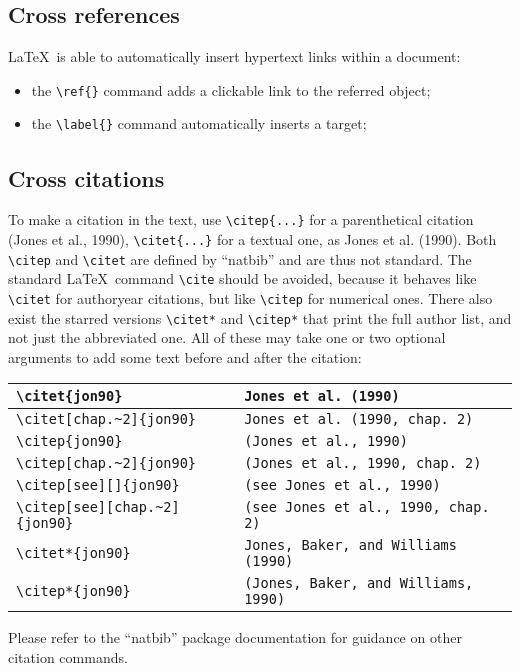 \documentclass{article}
\begin{document}
\subsection{Cross references}

\LaTeX\ is able to automatically insert hypertext links within a document:

\begin{itemize}
\item the \verb+\ref{}+ command adds a clickable link to the referred object;
\item the \verb+\label{}+ command automatically inserts a target;
\end{itemize}

\subsection{Cross citations }
To make a citation in the text, use \verb+\citep{...}+ for a parenthetical citation (Jones et al., 1990), \verb+\citet{...}+ for a textual one, as Jones et al. (1990). Both \verb+\citep+ and \verb+\citet+ are defined by ``natbib'' and are thus not standard. The standard \LaTeX\ command \verb+\cite+ should be avoided, because it behaves like \verb+\citet+ for authoryear citations, but like \verb+\citep+ for numerical ones. There also exist the starred versions \verb+\citet*+ and \verb+\citep*+ that print the full author list, and not just the abbreviated one. All of these may take one or two optional arguments to add some text before and after the citation:

\begin{center}\begin{tabular}{|l|l|}\hline
\verb+\citet{jon90}+&   \verb+Jones et al. (1990) +\\\hline
\verb+\citet[chap.~2]{jon90}+&  \verb+Jones et al. (1990, chap. 2) +\\\hline
\verb+\citep{jon90}+&   \verb+(Jones et al., 1990) +\\\hline
\verb+\citep[chap.~2]{jon90}+&  \verb+(Jones et al., 1990, chap. 2) +\\ \hline
\verb+\citep[see][]{jon90}+&    \verb+(see Jones et al., 1990) +\\\hline
\verb+\citep[see][chap.~2]{jon90}+&     \verb+(see Jones et al., 1990, chap. 2) +\\\hline
\verb+\citet*{jon90}+&  \verb+Jones, Baker, and Williams (1990) +\\\hline
\verb+\citep*{jon90}+&  \verb+(Jones, Baker, and Williams, 1990)+\\
\hline
\end{tabular}\end{center}
Please refer to the ``natbib'' package documentation for guidance on other citation commands.
\end{document}
